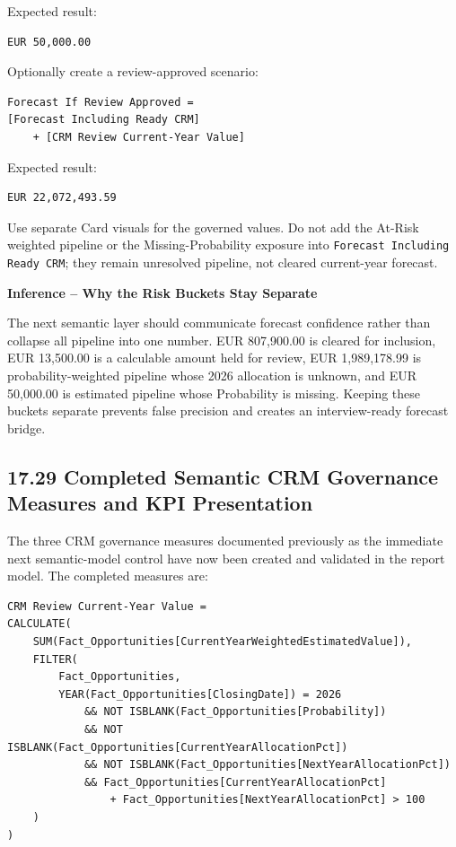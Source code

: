 \documentclass[11pt,a4paper]{article}
\begin{document}
Expected result:

\begin{lstlisting}[style=powerquery]
EUR 50,000.00
\end{lstlisting}

Optionally create a review-approved scenario:

\begin{lstlisting}[style=powerquery]
Forecast If Review Approved =
[Forecast Including Ready CRM]
    + [CRM Review Current-Year Value]
\end{lstlisting}

Expected result:

\begin{lstlisting}[style=powerquery]
EUR 22,072,493.59
\end{lstlisting}

Use separate Card visuals for the governed values. Do not add the At-Risk
weighted pipeline or the Missing-Probability exposure into
\texttt{Forecast Including Ready CRM}; they remain unresolved pipeline, not
cleared current-year forecast.

\begin{inferencebox}

\textbf{Inference -- Why the Risk Buckets Stay Separate}

The next semantic layer should communicate forecast confidence rather than
collapse all pipeline into one number. EUR 807,900.00 is cleared for inclusion,
EUR 13,500.00 is a calculable amount held for review, EUR 1,989,178.99 is
probability-weighted pipeline whose 2026 allocation is unknown, and
EUR 50,000.00 is estimated pipeline whose Probability is missing. Keeping these
buckets separate prevents false precision and creates an interview-ready
forecast bridge.

\end{inferencebox}

\subsection{17.29 Completed Semantic CRM Governance Measures and KPI Presentation}

The three CRM governance measures documented previously as the immediate next
semantic-model control have now been created and validated in the report model.
The completed measures are:

\begin{lstlisting}[style=powerquery]
CRM Review Current-Year Value =
CALCULATE(
    SUM(Fact_Opportunities[CurrentYearWeightedEstimatedValue]),
    FILTER(
        Fact_Opportunities,
        YEAR(Fact_Opportunities[ClosingDate]) = 2026
            && NOT ISBLANK(Fact_Opportunities[Probability])
            && NOT ISBLANK(Fact_Opportunities[CurrentYearAllocationPct])
            && NOT ISBLANK(Fact_Opportunities[NextYearAllocationPct])
            && Fact_Opportunities[CurrentYearAllocationPct]
                + Fact_Opportunities[NextYearAllocationPct] > 100
    )
)
\end{lstlisting}
\end{document}
